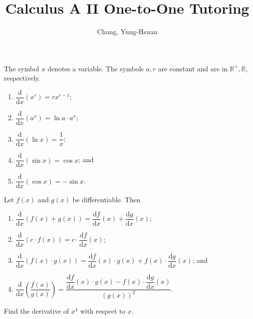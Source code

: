 \documentclass[11pt]{article}
\title{\textbf{Calculus A II One-to-One Tutoring}}
\author{Chang, Yung-Hsuan}
\theoremstyle{break}
\newcommand{\differentiate}[1]{\dfrac{\dd}{\dd{#1}}}
\newcommand{\derivative}[2]{\dfrac{\dd{#1}}{\dd{#2}}}
\newcommand{\dd}{\text{d}}
\newcommand{\bbR}{\mathbb{R}}
\numberwithin{equation}{theorem}
\begin{document}
\maketitle

\begin{theorem}
    The symbol $x$ denotes a variable. The symbols $a, r$ are constant and are in $\bbR^+, \bbR$, respectively. \vspace{-1.8em}
    \begin{multicols}{2}
        \begin{enumerate}
            \item $\differentiate{x}\left(x^r\right)=rx^{r-1}$;
            \item $\differentiate{x}\left(a^x\right)=\ln a\cdot a^x$;
            \item $\differentiate{x}\left(\ln x\right)=\dfrac{1}{x}$;
            \item $\differentiate{x}(\sin x)=\cos x$; and
            \item $\differentiate{x}(\cos x)=-\sin x$.
        \end{enumerate}
    \end{multicols}
    \vspace{0.2em}
\end{theorem}

\begin{theorem}
    Let $f(x)$ and $g(x)$ be differentiable. Then
    \begin{enumerate}
        \item $\differentiate{x}\left(f(x)+g(x)\right)=\derivative{f}{x}(x)+\derivative{g}{x}(x)$;
        \item $\differentiate{x}\left(c\cdot f(x)\right)=c\cdot\derivative{f}{x}(x)$;
        \item $\differentiate{x}\left(f(x)\cdot g(x)\right)=\derivative{f}{x}(x)\cdot g(x)+f(x)\cdot\derivative{g}{x}(x)$; and 
        \item $\differentiate{x}\left(\dfrac{f(x)}{g(x)}\right)=\dfrac{\derivative{f}{x}(x)\cdot g(x)-f(x)\cdot\derivative{g}{x}(x)}{\left(g(x)\right)^2}$.
    \end{enumerate}
\end{theorem}

\begin{example}
    Find the derivative of $x^4$ with respect to $x$.
\end{example}
\vspace{8em}
\end{document}
